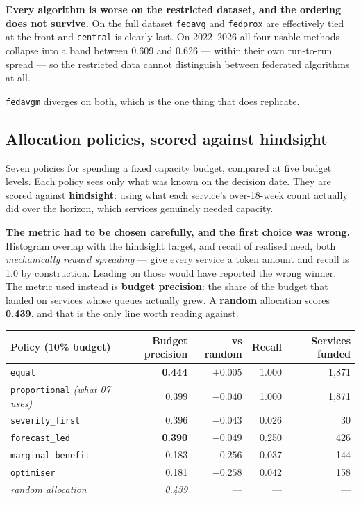 \documentclass[11pt,a4paper]{article}
\newcommand{\keypoint}[1]{%
  \par\vspace{0.4em}%
  \noindent\colorbox{fed!8}{\parbox{0.98\textwidth}{\vspace{0.2em}#1\vspace{0.2em}}}%
  \par\vspace{0.4em}}
\begin{document}
\keypoint{\textbf{Every algorithm is worse on the restricted dataset, and the ordering does not
survive.} On the full dataset \texttt{fedavg} and \texttt{fedprox} are effectively tied at the front
and \texttt{central} is clearly last. On 2022--2026 all four usable methods collapse into a band
between 0.609 and 0.626 --- within their own run-to-run spread --- so the restricted data cannot
distinguish between federated algorithms at all.

\texttt{fedavgm} diverges on both, which is the one thing that does replicate.}

\subsection{Allocation policies, scored against hindsight}

Seven policies for spending a fixed capacity budget, compared at five budget levels. Each policy sees
only what was known on the decision date. They are scored against \textbf{hindsight}: using what each
service's over-18-week count actually did over the horizon, which services genuinely needed capacity.

\keypoint{\textbf{The metric had to be chosen carefully, and the first choice was wrong.} Histogram
overlap with the hindsight target, and recall of realised need, both \emph{mechanically reward
spreading} --- give every service a token amount and recall is 1.0 by construction. Leading on those
would have reported the wrong winner. The metric used instead is \textbf{budget precision}: the share
of the budget that landed on services whose queues actually grew. A \textbf{random} allocation scores
\textbf{0.439}, and that is the only line worth reading against.}

\begin{center}
\small
\begin{tabular}{@{}lrrrr@{}}
\toprule
\textbf{Policy (10\% budget)} & \textbf{Budget precision} & \textbf{vs random} & \textbf{Recall} & \textbf{Services funded} \\
\midrule
\texttt{equal} & \textbf{0.444} & $+0.005$ & 1.000 & 1{,}871 \\
\texttt{proportional} \emph{(what 07 uses)} & 0.399 & $-0.040$ & 1.000 & 1{,}871 \\
\texttt{severity\_first} & 0.396 & $-0.043$ & 0.026 & 30 \\
\texttt{forecast\_led} & \textbf{0.390} & $-0.049$ & 0.250 & 426 \\
\texttt{marginal\_benefit} & 0.183 & $-0.256$ & 0.037 & 144 \\
\texttt{optimiser} & 0.181 & $-0.258$ & 0.042 & 158 \\
\midrule
\emph{random allocation} & \emph{0.439} & --- & --- & --- \\
\bottomrule
\end{tabular}
\end{center}
\end{document}
